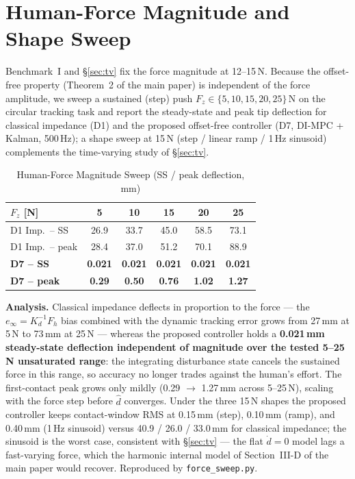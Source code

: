 \documentclass[journal]{IEEEtran}
\newcommand{\dhat}{\hat{d}}
\begin{document}
\section{Human-Force Magnitude and Shape Sweep}\label{sec:forcesweep}

Benchmark~I and \S\ref{sec:tv} fix the force magnitude at 12--15\,N.
Because the offset-free property (Theorem~2 of the main paper) is
independent of the force amplitude, we sweep a sustained (step) push
$F_z\in\{5,10,15,20,25\}$\,N on the circular tracking task and report the
steady-state and peak tip deflection for classical impedance (D1) and
the proposed offset-free controller (D7, DI-MPC + Kalman, 500\,Hz); a
shape sweep at 15\,N (step / linear ramp / 1\,Hz sinusoid) complements
the time-varying study of \S\ref{sec:tv}.

\begin{table}[!t]
\caption{Human-Force Magnitude Sweep (SS / peak deflection, mm)}
\label{tab:fsweep}
\renewcommand{\arraystretch}{1.0}
\footnotesize
\setlength{\tabcolsep}{3pt}
\begin{tabular}{lccccc}
\toprule
$F_z$ [N] & 5 & 10 & 15 & 20 & 25\\
\midrule
D1 Imp.\ -- SS   & 26.9 & 33.7 & 45.0 & 58.5 & 73.1\\
D1 Imp.\ -- peak & 28.4 & 37.0 & 51.2 & 70.1 & 88.9\\
\textbf{D7 -- SS}   & \textbf{0.021} & \textbf{0.021} & \textbf{0.021} & \textbf{0.021} & \textbf{0.021}\\
\textbf{D7 -- peak} & \textbf{0.29} & \textbf{0.50} & \textbf{0.76} & \textbf{1.02} & \textbf{1.27}\\
\bottomrule
\end{tabular}
\end{table}

\textbf{Analysis.} Classical impedance deflects in proportion to the
force --- the $e_\infty=K_d^{-1}F_h$ bias combined with the dynamic
tracking error grows from 27\,mm at 5\,N to 73\,mm at 25\,N --- whereas
the proposed controller holds a \textbf{0.021\,mm steady-state
deflection independent of magnitude over the tested 5--25\,N unsaturated
range}: the integrating disturbance state cancels the sustained force in this
range, so accuracy no longer trades
against the human's effort. The first-contact peak grows only mildly
(0.29 $\to$ 1.27\,mm across 5--25\,N), scaling with the force step
before $\dhat$ converges. Under the three 15\,N shapes the proposed
controller keeps contact-window RMS at 0.15\,mm (step), 0.10\,mm (ramp),
and 0.40\,mm (1\,Hz sinusoid) versus 40.9 / 26.0 / 33.0\,mm for classical
impedance; the sinusoid is the worst case, consistent with
\S\ref{sec:tv} --- the flat $\dot d=0$ model lags a fast-varying force,
which the harmonic internal model of Section~III-D of the main paper
would recover. Reproduced by \texttt{force\_sweep.py}.
\end{document}
